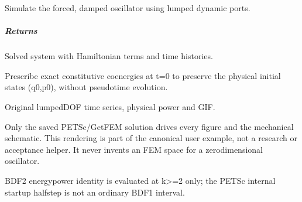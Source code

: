 \documentclass[letterpaper,10pt,english]{sphinxmanual}
\begin{document}
\begin{fulllineitems}

\pysigstartsignatures
\pysiglinewithargsret
{}
{\sphinxparamcomma {}\sphinxparamcomma {}\sphinxparamcomma {}\sphinxparamcomma {}\sphinxparamcomma {}}
{}
\pysigstopsignatures
\sphinxAtStartPar
Simulate the forced, damped oscillator using lumped dynamic ports.


\subparagraph{Returns}
\label{\detokenize{scrimp.examples:returns}}\begin{description}
\sphinxAtStartPar
Solved system with Hamiltonian terms and time histories.

\end{description}

\sphinxAtStartPar
Prescribe exact constitutive co\sphinxhyphen{}energies at t=0 to preserve
the physical initial states (q0,p0), without pseudo\sphinxhyphen{}time evolution.

\end{fulllineitems}



\begin{fulllineitems}

\pysigstartsignatures
\pysiglinewithargsret
{}
{\sphinxparamcomma {}\sphinxparamcomma {}\sphinxparamcomma {}\sphinxparamcomma {}\sphinxparamcomma {}}
{}
\pysigstopsignatures
\sphinxAtStartPar
Original lumped\sphinxhyphen{}DOF time series, physical power and GIF.

\sphinxAtStartPar
Only the saved PETSc/GetFEM solution drives every figure and the
mechanical schematic. This rendering is part of the canonical
user example, not a research or acceptance helper. It never
invents an FEM space for a zero\sphinxhyphen{}dimensional oscillator.

\sphinxAtStartPar
BDF2 energy\sphinxhyphen{}power identity is evaluated at k\textgreater{}=2 only; the PETSc
internal startup half\sphinxhyphen{}step is not an ordinary BDF1 interval.

\end{fulllineitems}
\end{document}

